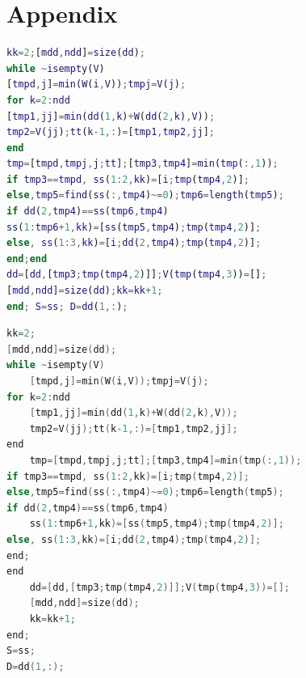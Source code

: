 \documentclass{apmcmthesis}
\begin{document}
\section{Appendix}
\begin{lstlisting}[language=matlab,caption={The matlab Source code of Algorithm}]
kk=2;[mdd,ndd]=size(dd);
while ~isempty(V)
[tmpd,j]=min(W(i,V));tmpj=V(j);
for k=2:ndd
[tmp1,jj]=min(dd(1,k)+W(dd(2,k),V));
tmp2=V(jj);tt(k-1,:)=[tmp1,tmp2,jj];
end
tmp=[tmpd,tmpj,j;tt];[tmp3,tmp4]=min(tmp(:,1));
if tmp3==tmpd, ss(1:2,kk)=[i;tmp(tmp4,2)];
else,tmp5=find(ss(:,tmp4)~=0);tmp6=length(tmp5);
if dd(2,tmp4)==ss(tmp6,tmp4)
ss(1:tmp6+1,kk)=[ss(tmp5,tmp4);tmp(tmp4,2)];
else, ss(1:3,kk)=[i;dd(2,tmp4);tmp(tmp4,2)];
end;end
dd=[dd,[tmp3;tmp(tmp4,2)]];V(tmp(tmp4,3))=[];
[mdd,ndd]=size(dd);kk=kk+1;
end; S=ss; D=dd(1,:);
 \end{lstlisting}
\begin{lstlisting}[language=c,caption={The lingo source code}]
kk=2;
[mdd,ndd]=size(dd);
while ~isempty(V)
    [tmpd,j]=min(W(i,V));tmpj=V(j);
for k=2:ndd
    [tmp1,jj]=min(dd(1,k)+W(dd(2,k),V));
    tmp2=V(jj);tt(k-1,:)=[tmp1,tmp2,jj];
end
    tmp=[tmpd,tmpj,j;tt];[tmp3,tmp4]=min(tmp(:,1));
if tmp3==tmpd, ss(1:2,kk)=[i;tmp(tmp4,2)];
else,tmp5=find(ss(:,tmp4)~=0);tmp6=length(tmp5);
if dd(2,tmp4)==ss(tmp6,tmp4)
    ss(1:tmp6+1,kk)=[ss(tmp5,tmp4);tmp(tmp4,2)];
else, ss(1:3,kk)=[i;dd(2,tmp4);tmp(tmp4,2)];
end;
end
    dd=[dd,[tmp3;tmp(tmp4,2)]];V(tmp(tmp4,3))=[];
    [mdd,ndd]=size(dd);
    kk=kk+1;
end;
S=ss;
D=dd(1,:);
 \end{lstlisting}
\end{document}
